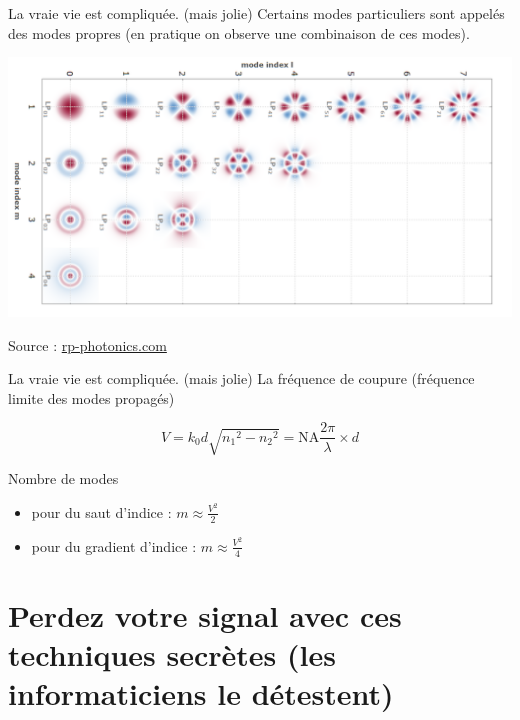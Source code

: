 \documentclass[aspectratio=149, 10pt, t]{beamer}
\begin{document}
\begin{frame}{La vraie vie est compliquée. (mais jolie)}
    Certains modes particuliers sont appelés des modes propres (en pratique on observe une combinaison de ces modes).

    \centering
    \includegraphics[height=0.55\textheight]{images/fiber_modes}

    {\footnotesize Source : \href{https://www.rp-photonics.com/lp_modes.html}{rp-photonics.com}}
\end{frame}
\begin{frame}{La vraie vie est compliquée. (mais jolie)}
    La fréquence de coupure (fréquence limite des modes propagés)
    
    $$V=k_0d\sqrt{{n_1}^2-{n_2}^2} = \text{NA}\frac{2\pi}{\lambda}\times d$$
    
    Nombre de modes \begin{itemize}
        \item pour du saut d'indice : $m \approx \frac{V^2}{2}$
        \item pour du gradient d'indice : $m\approx\frac{V^2}{4}$
    \end{itemize}
\end{frame}

\section{Perdez votre signal avec ces techniques secrètes (les informaticiens le détestent)}
\end{document}
